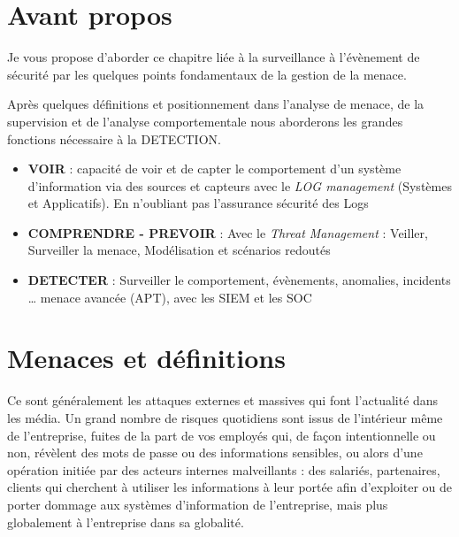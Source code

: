 


\section{Avant propos}

Je vous propose d'aborder ce chapitre liée à la surveillance à l'évènement de sécurité par les quelques points fondamentaux de la gestion de la menace.


Après quelques définitions et positionnement dans l'analyse de menace,  de la supervision et de l'analyse comportementale nous aborderons les grandes fonctions nécessaire à la DETECTION.

\begin{itemize}
  \item \textbf{VOIR} :  capacité de voir et de capter le comportement d'un système d'information via des sources et capteurs avec le \textit{LOG management} (Systèmes et Applicatifs). En n'oubliant pas l'assurance sécurité des Logs
\item \textbf{COMPRENDRE - PREVOIR} : Avec le \textit{Threat Management} : Veiller, Surveiller la menace, Modélisation et scénarios redoutés
\item \textbf{DETECTER} : Surveiller le comportement, 
évènements, anomalies, incidents … menace avancée (APT), avec les SIEM et les SOC
\end{itemize}


\section{Menaces et définitions}

Ce sont généralement les attaques externes et massives qui font l’actualité dans les média. Un grand nombre de risques quotidiens sont issus de l'intérieur même de l'entreprise,  fuites de la part de vos employés qui, de façon intentionnelle ou non, révèlent des mots de passe ou des informations sensibles, ou alors d’une opération initiée par des acteurs internes malveillants : des salariés, partenaires, clients qui cherchent à utiliser les informations à leur portée afin d’exploiter ou de porter dommage aux systèmes d'information de l’entreprise, mais plus globalement à l'entreprise dans sa globalité.

